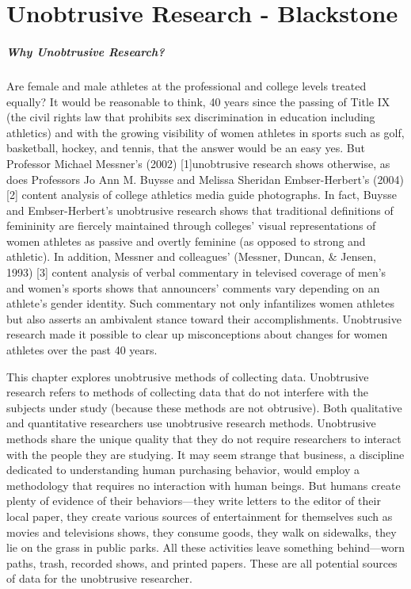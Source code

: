 \chapter{Unobtrusive Research - Blackstone}\label{ch12:unobtrusive_research}

\paragraph{Why Unobtrusive Research?}

Are female and male athletes at the professional and college levels treated equally? It would be reasonable to think, 40 years since the passing of Title IX (the civil rights law that prohibits sex discrimination in education including athletics) and with the growing visibility of women athletes in sports such as golf, basketball, hockey, and tennis, that the answer would be an easy yes. But Professor Michael Messner’s (2002) [1]unobtrusive research shows otherwise, as does Professors Jo Ann M. Buysse and Melissa Sheridan Embser-Herbert’s (2004) [2] content analysis of college athletics media guide photographs. In fact, Buysse and Embser-Herbert’s unobtrusive research shows that traditional definitions of femininity are fiercely maintained through colleges’ visual representations of women athletes as passive and overtly feminine (as opposed to strong and athletic). In addition, Messner and colleagues’ (Messner, Duncan, \& Jensen, 1993) [3] content analysis of verbal commentary in televised coverage of men’s and women’s sports shows that announcers’ comments vary depending on an athlete’s gender identity. Such commentary not only infantilizes women athletes but also asserts an ambivalent stance toward their accomplishments. Unobtrusive research made it possible to clear up misconceptions about changes for women athletes over the past 40 years.

This chapter explores unobtrusive methods of collecting data. Unobtrusive research refers to methods of collecting data that do not interfere with the subjects under study (because these methods are not obtrusive). Both qualitative and quantitative researchers use unobtrusive research methods. Unobtrusive methods share the unique quality that they do not require researchers to interact with the people they are studying. It may seem strange that business, a discipline dedicated to understanding human purchasing behavior, would employ a methodology that requires no interaction with human beings. But humans create plenty of evidence of their behaviors—they write letters to the editor of their local paper, they create various sources of entertainment for themselves such as movies and televisions shows, they consume goods, they walk on sidewalks, they lie on the grass in public parks. All these activities leave something behind—worn paths, trash, recorded shows, and printed papers. These are all potential sources of data for the unobtrusive researcher.

